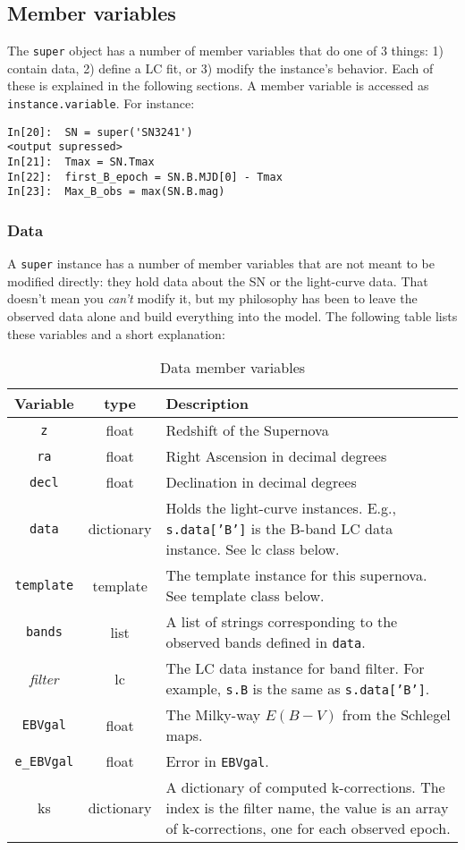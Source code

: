 \documentclass[12pt]{article}
\providecommand{\tabularnewline}{\\}
\begin{document}
\subsection{Member variables}

The \texttt{super} object has a number of member variables that do
one of 3 things: 1) contain data, 2) define a LC fit, or 3) modify
the instance's behavior. Each of these is explained in the following
sections. A member variable is accessed as \texttt{instance.variable}.
For instance:

\begin{verbatim}
In[20]:  SN = super('SN3241')
<output supressed>
In[21]:  Tmax = SN.Tmax
In[22]:  first_B_epoch = SN.B.MJD[0] - Tmax
In[23]:  Max_B_obs = max(SN.B.mag)
\end{verbatim}


\subsubsection{Data}

A \texttt{super} instance has a number of member variables that are
not meant to be modified directly: they hold data about the SN or
the light-curve data. That doesn't mean you \emph{can't} modify it,
but my philosophy has been to leave the observed data alone and build
everything into the model. The following table lists these variables
and a short explanation:

%
\begin{table}
\begin{tabular}{|c|c|>{\raggedright}p{}|}
\hline 
Variable&
type&
Description\tabularnewline
\hline
\hline 
\texttt{z}&
float&
Redshift of the Supernova\tabularnewline
\hline 
\texttt{ra}&
float&
Right Ascension in decimal degrees\tabularnewline
\hline 
\texttt{decl}&
float&
Declination in decimal degrees\tabularnewline
\hline 
\texttt{data}&
dictionary&
Holds the light-curve instances. E.g., \texttt{s.data{[}'B']} is the
B-band LC data instance. See lc class below.\tabularnewline
\hline 
\texttt{template}&
template&
The template instance for this supernova. See template class below.\tabularnewline
\hline 
\texttt{bands}&
list&
A list of strings corresponding to the observed bands defined in \texttt{data}.\tabularnewline
\hline 
\emph{filter}&
lc&
The LC data instance for band filter. For example, \texttt{s.B} is
the same as \texttt{s.data{[}'B']}.\tabularnewline
\hline 
\texttt{EBVgal}&
float&
The Milky-way $E\left(B-V\right)$ from the Schlegel maps.\tabularnewline
\hline 
\texttt{e\_EBVgal}&
float&
Error in \texttt{EBVgal}.\tabularnewline
\hline 
ks&
dictionary&
A dictionary of computed k-corrections. The index is the filter name,
the value is an array of k-corrections, one for each observed epoch.\tabularnewline
\hline
\end{tabular}


\caption{Data member variables}
\end{table}
\end{document}

